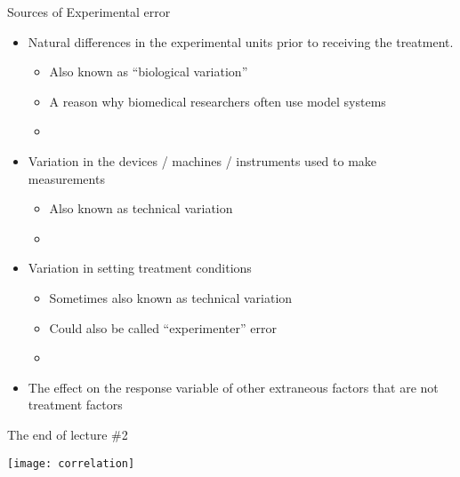 \documentclass[xcolor=dvipsnames]{beamer}
\begin{document}
\begin{frame}{Sources of Experimental error}
	\begin{itemize}
		\item Natural differences in the experimental units prior to receiving the treatment. \pause
		\begin{itemize}
			\item Also known as ``biological variation'' \pause
			\item A reason why biomedical researchers often use model systems \pause
			\item[]
		\end{itemize}
		\item Variation in the devices / machines / instruments used to make measurements \pause
		\begin{itemize}
			\item Also known as technical variation \pause
			\item[]
		\end{itemize}
		\item Variation in setting treatment conditions \pause
				\begin{itemize}
			\item Sometimes also known as technical variation \pause
			\item Could also be called ``experimenter'' error
			\item[]
		\end{itemize}
	\item The effect on the response variable of other extraneous factors that are not treatment factors
	\end{itemize}
\end{frame}

\begin{frame}{The end of lecture \#2}
	\begin{center}
		\texttt{[image: correlation]}
	\end{center}
\end{frame}
\end{document}

